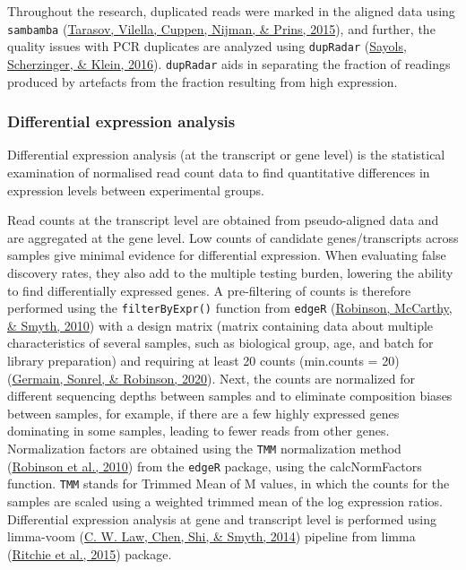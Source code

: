 \documentclass[12pt,twoside]{reedthesis}
\begin{document}
Throughout the research, duplicated reads were marked in the aligned
data using \texttt{sambamba} (\protect\hyperlink{ref-tarasov2015}{Tarasov, Vilella, Cuppen, Nijman, \& Prins, 2015}), and further, the quality issues
with PCR duplicates are analyzed using \texttt{dupRadar} (\protect\hyperlink{ref-sayols2016}{Sayols, Scherzinger, \& Klein, 2016}).
\texttt{dupRadar} aids in separating the fraction of readings produced by
artefacts from the fraction resulting from high expression.

\hypertarget{m3.2.3}{%
\subsubsection*{Differential expression analysis}\label{m3.2.3}}

Differential expression analysis (at the transcript or gene level) is
the statistical examination of normalised read count data to find
quantitative differences in expression levels between experimental
groups.

Read counts at the transcript level are obtained from pseudo-aligned
data and are aggregated at the gene level. Low counts of candidate
genes/transcripts across samples give minimal evidence for differential
expression. When evaluating false discovery rates, they also add to the
multiple testing burden, lowering the ability to find differentially
expressed genes. A pre-filtering of counts is therefore performed using
the \texttt{filterByExpr()} function from \texttt{edgeR} (\protect\hyperlink{ref-robinson2010}{Robinson, McCarthy, \& Smyth, 2010}) with a design
matrix (matrix containing data about multiple characteristics of several
samples, such as biological group, age, and batch for library
preparation) and requiring at least 20 counts (min.counts = 20)
(\protect\hyperlink{ref-germain2020}{Germain, Sonrel, \& Robinson, 2020}). Next, the counts are normalized for different sequencing
depths between samples and to eliminate composition biases between
samples, for example, if there are a few highly expressed genes
dominating in some samples, leading to fewer reads from other genes.
Normalization factors are obtained using the \texttt{TMM} normalization method
(\protect\hyperlink{ref-robinson2010}{Robinson et al., 2010}) from the \texttt{edgeR} package, using the calcNormFactors
function. \texttt{TMM} stands for Trimmed Mean of M values, in which the counts
for the samples are scaled using a weighted trimmed mean of the log
expression ratios. Differential expression analysis at gene and
transcript level is performed using limma-voom (\protect\hyperlink{ref-law2014}{C. W. Law, Chen, Shi, \& Smyth, 2014}) pipeline from
limma (\protect\hyperlink{ref-ritchie2015}{Ritchie et al., 2015}) package.
\end{document}
